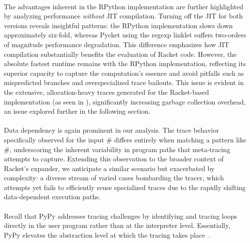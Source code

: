 			\paragraph{}%
				The advantages inherent in the RPython implementation are further highlighted by analyzing performance \emph{without} JIT compilation. Turning off the JIT for both versions reveals insightful patterns: the RPython implementation slows down approximately six-fold, whereas Pycket using the regexp linklet suffers  two-orders of magnitude performance degradation. This difference emphasizes how JIT compilation substantially benefits the evaluation of Racket code. However, the absolute fastest runtime remains with the RPython implementation, reflecting its superior capacity to capture the computation's essence and avoid pitfalls such as mispredicted branches and overspecialized trace bailouts. This issue is evident in the extensive, allocation-heavy traces generated for the Racket-based implementation (as seen in ), significantly increasing garbage collection overhead, an issue explored further in the following section.

			\paragraph{}%
				Data dependency is again prominent in our analysis. The trace behavior specifically observed for the input $\mathtt{\#}$ differs entirely when matching a pattern like $\mathtt{\#}$, underscoring the inherent variability in program paths that meta-tracing attempts to capture. Extending this observation to the broader context of Racket's expander, we anticipate a similar scenario but exacerbated by complexity: a diverse stream of varied cases bombarding the tracer, which attempts yet fails to efficiently reuse specialized traces due to the rapidly shifting data-dependent execution paths.

			\paragraph{}%
				Recall that PyPy addresses tracing challenges by identifying and tracing loops directly in the user program rather than at the interpreter level. Essentially, PyPy elevates the abstraction level at which the tracing takes place~\cite{pypy-main}.


